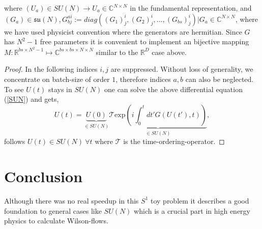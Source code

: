 \documentclass[12pt,a4paper]{article}
\begin{document}
where $(U_a)\in SU(N) \rightarrow U_a \in \mathbb{C}^{N\times N}$ in the fundamental representation, and $(G_a) \in \mathfrak{su}(N), G^{ai}_{bj} := diag((G_1)^i_j, (G_2)^i_j, \ldots, (G_{bs})^i_j) | G_a \in \mathbb{C}^{N\times N}$, where we have used physicist convention where the generators are hermitian. Since $G$ has $N^2-1$ free parameters it is convenient to implement an bijective mapping $M:\mathbb{R}^{bs \times N^2-1 } \mapsto \mathbb{C}^{bs \times bs \times N \times N }$ similar to the $\mathbb{R}^D$ case above.

\begin{proof}
 In the following indices $i,j$ are suppressed. Without loss of generality, we concentrate on batch-size of order $1$, therefore indices $a,b$ can also be neglected. To see $U(t)$ stays in $SU(N)$ one can solve the above differential equation (\ref{SUN}) and gets,
$$
U(t) =  \underbrace{U(0)}_{\in SU(N)} \underbrace{\mathcal{T}\text{exp}(i\int_0^t dt' G(U(t'),t))}_{\in SU(N)}, $$
follows $ U(t) \in SU(N)\  \forall t $
where $\mathcal{T}$ is the time-ordering-operator.
\end{proof}

\section{Conclusion}
Although there was no real speedup in this $S^1$ toy problem it describes a good foundation to general cases like $SU(N)$ which is a crucial part in high energy physics to calculate Wilson-flows. 

\printbibliography
\end{document}
